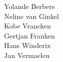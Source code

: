 \flushright{}
Yolande Berbers\\
Neline van Ginkel\\
Kobe Vrancken\\
Gertjan Franken\\
Hans Winderix\\
Jan Vermaelen\\